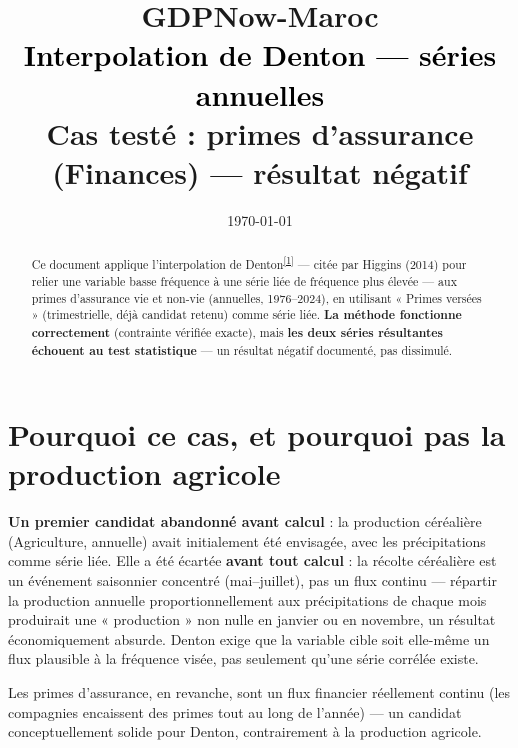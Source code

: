 \documentclass[11pt,a4paper]{article}
\title{\vspace{-1.3cm}\textcolor{bleuprincip}{\Huge\bfseries GDPNow-Maroc}\\[0.3cm]
\textcolor{black}{\Large Interpolation de Denton --- séries annuelles}\\[0.15cm]
\textcolor{orangealerte}{\large Cas testé : primes d'assurance (Finances) --- résultat négatif}}
\author{}
\date{\today}
\newcommand{\cit}[1]{\textsuperscript{\hyperlink{ref#1}{[#1]}}}
\begin{document}
\maketitle
\thispagestyle{empty}

\begin{abstract}
\noindent Ce document applique l'interpolation de Denton\cit{1} --- citée par Higgins (2014) pour relier une variable basse fréquence à une série liée de fréquence plus élevée --- aux primes d'assurance vie et non-vie (annuelles, 1976--2024), en utilisant « Primes versées » (trimestrielle, déjà candidat retenu) comme série liée. \textbf{La méthode fonctionne correctement} (contrainte vérifiée exacte), mais \textbf{les deux séries résultantes échouent au test statistique} --- un résultat négatif documenté, pas dissimulé.
\end{abstract}

\tableofcontents
\vspace{0.3cm}

\section{Pourquoi ce cas, et pourquoi pas la production agricole}

\begin{alertebox}
\textbf{Un premier candidat abandonné avant calcul} : la production céréalière (Agriculture, annuelle) avait initialement été envisagée, avec les précipitations comme série liée. Elle a été écartée \textbf{avant tout calcul} : la récolte céréalière est un événement saisonnier concentré (mai--juillet), pas un flux continu --- répartir la production annuelle proportionnellement aux précipitations de chaque mois produirait une « production » non nulle en janvier ou en novembre, un résultat économiquement absurde. Denton exige que la variable cible soit elle-même un flux plausible à la fréquence visée, pas seulement qu'une série corrélée existe.
\end{alertebox}

Les primes d'assurance, en revanche, sont un flux financier réellement continu (les compagnies encaissent des primes tout au long de l'année) --- un candidat conceptuellement solide pour Denton, contrairement à la production agricole.

\end{document}
